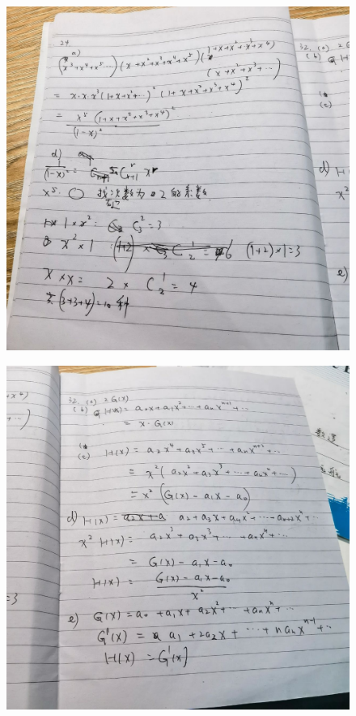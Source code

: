 \documentclass{article}
\begin{document}
   
    \begin{figure}[H]
    \centering
    \includegraphics[width=1\textwidth]{IMG_20221205_183642.jpg}
    \caption{\label{Lab9}}
    \end{figure}

   
    \begin{figure}[H]
    \centering
    \includegraphics[width=1\textwidth]{IMG_20221205_183645.jpg}
    \caption{\label{Lab9}}
    \end{figure}
\end{document}
